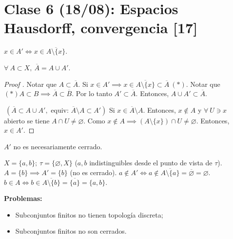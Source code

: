 
	\section{Clase 6 (18/08): Espacios Hausdorff, convergencia [17]}

	\begin{remark}
		$x \in A' \iff x \in \overline{A \setminus \{x\}}$. 
	\end{remark}

	\begin{lemma}
		$\forall \ A \subset X,\ \overline{A} = A \cup A'$.
	\end{lemma}

	\begin{proof}[Proof ]
		\fbox{$\supset$} Notar que $A \subset \overline{A}$. Si $x \in A' \implies x \in \overline{A \setminus \{x\}} \subset \overline{A} \ (*)$. Notar que $(*) A \subset B \implies \overline{A} \subset \overline{B}$. Por lo tanto $A' \subset \overline{A}$. Entonces, $A \cup A' \subset \overline{A}$.

		\noindent \fbox{$\subset$} $\ (\overline{A} \subset A \cup A', \text{ equiv: } \overline{A}\setminus A \subset A')$ Si $x \in \overline{A} \setminus A$. Entonces, $x \not\in A$ y $\forall \ U \ni x$ abierto se tiene $A \cap U \neq \varnothing$. Como $x \not\in A \implies (A \setminus \{x\}) \cap U \neq \varnothing$. Entonces, $x \in A'$.  
	\end{proof}

	\begin{remark}
		$A'$ no es necesariamente cerrado.
	\end{remark}

	\begin{eg}
		$X = \{ a,b \};\ \tau = \{ \varnothing, X \}$ ($a,b$ indistinguibles desde el punto de vista de $\tau$). $A = \{ b \} \implies A' = \{b\} $ (no es cerrado). $a \not\in A' \iff a \not\in \overline{A \setminus \{a\} } = \overline{\varnothing} = \varnothing$. $b \in A \iff b \in \overline{A \setminus \{b\} } = \overline{\{a\}} = \{a,b\}$.      
	\end{eg}

	\noindent \textbf{Problemas:}
	\begin{itemize}
		\item Subconjuntos finitos no tienen topología discreta;

		\item Subconjuntos finitos no son cerrados.
	\end{itemize}

